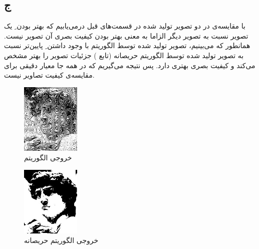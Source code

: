 \documentclass{article}
\begin{document}
\subsection{ج}
\begin{latin}

\end{latin}
با مقایسه‌ی  در دو تصویر تولید شده در قسمت‌های قبل درمی‌یابیم که بهتر بودن ِ یک تصویر نسبت به تصویر دیگر الزاما به معنی بهتر بودن کیفیت بصری آن تصویر نیست. همانطور که می‌بینیم، تصویر تولید شده توسط الگوریتم  با وجود داشتن ِ پایین‌تر نسبت به تصویر تولید شده توسط الگوریتم حریصانه (تابع ) جزئیات تصویر را بهتر مشخص می‌کند و کیفیت بصری بهتری دارد. پس نتیجه می‌گیریم که  در همه جا معیار دقیقی برای مقایسه‌ی کیفیت تصاویر نیست.
\begin{figure}[H]
    \centering
    \includegraphics[width=0.25\textwidth]{figures/3c1.jpg}
    \caption
	{
خروجی الگوریتم 
	}
    \label{fig:fig1}
\end{figure}
\begin{figure}[H]
    \centering
    \includegraphics[width=0.25\textwidth]{figures/3c2.jpg}
    \caption
	{
خروجی الگوریتم حریصانه
	}
    \label{fig:fig1}
\end{figure}



%



\end{document}
